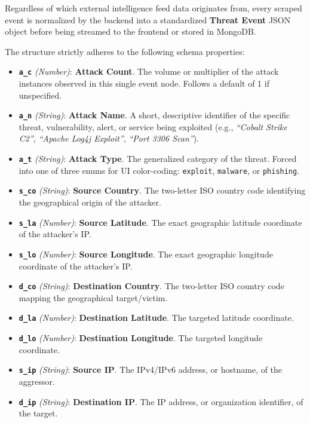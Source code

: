 \documentclass[12pt,a4paper]{article}
\begin{document}
Regardless of which external intelligence feed data originates from, every scraped event is normalized by the backend into a standardized \textbf{Threat Event} JSON object before being streamed to the frontend or stored in MongoDB. 

The structure strictly adheres to the following schema properties:

\begin{itemize}[leftmargin=*]
    \item \textbf{\texttt{a\_c}} \textit{(Number)}: \textbf{Attack Count}. The volume or multiplier of the attack instances observed in this single event node. Follows a default of 1 if unspecified.
    \item \textbf{\texttt{a\_n}} \textit{(String)}: \textbf{Attack Name}. A short, descriptive identifier of the specific threat, vulnerability, alert, or service being exploited (e.g., \textit{``Cobalt Strike C2''}, \textit{``Apache Log4j Exploit''}, \textit{``Port 3306 Scan''}).
    \item \textbf{\texttt{a\_t}} \textit{(String)}: \textbf{Attack Type}. The generalized category of the threat. Forced into one of three enums for UI color-coding: \texttt{exploit}, \texttt{malware}, or \texttt{phishing}.
    \item \textbf{\texttt{s\_co}} \textit{(String)}: \textbf{Source Country}. The two-letter ISO country code identifying the geographical origin of the attacker.
    \item \textbf{\texttt{s\_la}} \textit{(Number)}: \textbf{Source Latitude}. The exact geographic latitude coordinate of the attacker's IP.
    \item \textbf{\texttt{s\_lo}} \textit{(Number)}: \textbf{Source Longitude}. The exact geographic longitude coordinate of the attacker's IP.
    \item \textbf{\texttt{d\_co}} \textit{(String)}: \textbf{Destination Country}. The two-letter ISO country code mapping the geographical target/victim.
    \item \textbf{\texttt{d\_la}} \textit{(Number)}: \textbf{Destination Latitude}. The targeted latitude coordinate.
    \item \textbf{\texttt{d\_lo}} \textit{(Number)}: \textbf{Destination Longitude}. The targeted longitude coordinate.
    \item \textbf{\texttt{s\_ip}} \textit{(String)}: \textbf{Source IP}. The IPv4/IPv6 address, or hostname, of the aggressor.
    \item \textbf{\texttt{d\_ip}} \textit{(String)}: \textbf{Destination IP}. The IP address, or organization identifier, of the target.

\end{itemize}
\end{document}
